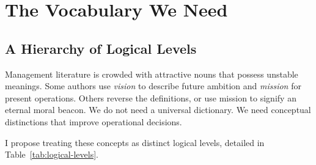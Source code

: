 \section{The Vocabulary We Need}

\subsection{A Hierarchy of Logical Levels}

Management literature is crowded with attractive nouns that possess unstable meanings. Some authors use \textit{vision} to describe future ambition and \textit{mission} for present operations. Others reverse the definitions, or use mission to signify an eternal moral beacon. We do not need a universal dictionary. We need conceptual distinctions that improve operational decisions.

I propose treating these concepts as distinct logical levels, detailed in Table~\ref{tab:logical-levels}.

